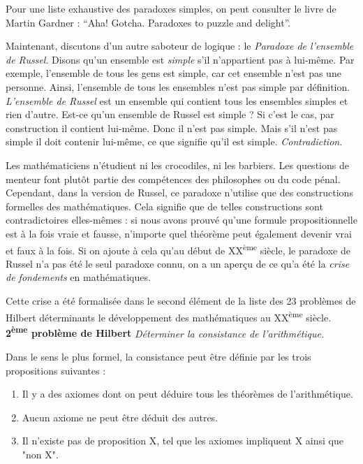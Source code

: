 Pour une liste exhaustive des paradoxes simples, on peut consulter le livre de Martin Gardner : ``Aha! Gotcha. Paradoxes to puzzle and delight''.

Maintenant, discutons d'un autre saboteur de logique : le \emph{Paradoxe de l'ensemble de Russel}.
Disons qu'un ensemble est \emph{simple} s'il n'appartient pas à lui-même. Par exemple, l'ensemble de tous les gens est simple, car cet ensemble n'est pas une personne. Ainsi, l'ensemble de tous les ensembles n'est pas simple par définition. \emph{L'ensemble de Russel} est un ensemble qui contient tous les ensembles simples et rien d'autre.
Est-ce qu'un ensemble de Russel est simple ? Si c'est le cas, par construction il contient lui-même. Donc il n'est pas simple. Mais s'il n'est pas simple il doit contenir lui-même, ce que signifie qu'il est simple. \emph{Contradiction}.

Les mathématiciens n'étudient ni les crocodiles, ni les barbiers.
Les questions de menteur font plutôt partie des compétences des philosophes ou du code pénal.
Cependant, dans la version de Russel, ce paradoxe n'utilise que des constructions formelles des mathématiques. Cela signifie que de telles constructions sont contradictoires elles-mêmes : si nous avons prouvé qu'une formule propositionnelle est à la fois vraie et fausse, n'importe quel théorème peut également devenir vrai et faux à la fois.
Si on ajoute à cela qu'au début de XX\textsuperscript{ème} siècle, le paradoxe de Russel n'a pas été le seul paradoxe connu, on a un aperçu de ce qu'a été la \emph{crise de fondements} en mathématiques.

Cette crise a été formalisée dans le second élément de la liste des 23 problèmes de Hilbert déterminants le développement des mathématiques au XX\textsuperscript{ème} siècle. \\
\textbf{2\textsuperscript{ème} problème de Hilbert}
\textit{Déterminer la consistance de l'arithmétique.}

Dans le sens le plus formel, la consistance peut être définie par les trois propositions suivantes :

\begin{enumerate}
	\item Il y a des axiomes dont on peut déduire tous les théorèmes de l'arithmétique.
	\item Aucun axiome ne peut être déduit des autres.
	\item Il n'existe pas de proposition X, tel que les axiomes impliquent X ainsi que "non X".
\end{enumerate}

